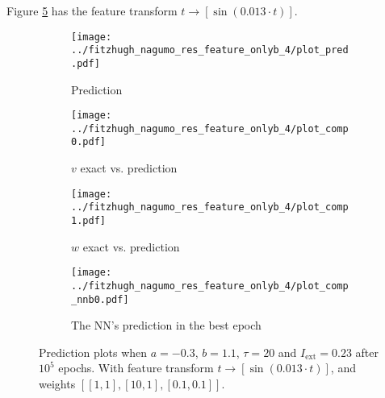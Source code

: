 \documentclass[a4paper]{article}
\begin{document}
Figure \ref{plot:justb05} has the feature transform  $t \rightarrow \left[ \sin(0.013\cdot t) \right] $.

\begin{figure}[H]
	\centering 
	\begin{subfigure}[b]{0.47\textwidth}
		\centering
		\texttt{[image: ../fitzhugh\_nagumo\_res\_feature\_onlyb\_4/plot\_pred.pdf]}
		\caption{Prediction}
		\label{fig:justb05a}
	\end{subfigure}
	\begin{subfigure}[b]{0.47\textwidth}
		\centering
		\texttt{[image: ../fitzhugh\_nagumo\_res\_feature\_onlyb\_4/plot\_comp0.pdf]}
		\caption{$v$ exact vs. prediction}
		\label{fig:justb05b}
	\end{subfigure}
	\begin{subfigure}[b]{0.47\textwidth}
		\centering
		\texttt{[image: ../fitzhugh\_nagumo\_res\_feature\_onlyb\_4/plot\_comp1.pdf]}
		\caption{$w$ exact vs. prediction}
		\label{fig:justb05c}
	\end{subfigure}
	\begin{subfigure}[b]{0.47\textwidth}
		\centering
		\texttt{[image: ../fitzhugh\_nagumo\_res\_feature\_onlyb\_4/plot\_comp\_nnb0.pdf]}
		\caption{The NN's prediction in the best epoch}
		\label{fig:justb05d}
	\end{subfigure}
	\caption{Prediction plots when $a=-0.3$, $b=1.1$, $\tau=20$ and $ I_{\text{ext}}=0.23$ after $10^5$ epochs. With feature transform $t \rightarrow \left[ \sin(0.013\cdot t) \right] $, and weights $\left[ \left[ 1, 1\right], \left[ 10, 1\right], \left[ 0.1, 0.1 \right]\right]$.}
	\label{plot:justb05}
\end{figure} 	
\end{document}
